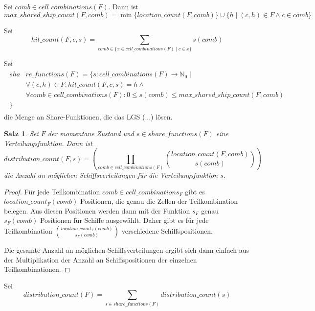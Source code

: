 \documentclass[a4paper,12pt]{llncs}
\newcommand{\N}{{\mathbb{N}}}
\numberwithin{equation}{section}
\newtheorem{satz}{Satz}
\begin{document}
\begin{definition}
Sei $comb \in cell\_combinations(F)$. Dann ist
\[
max\_shared\_ship\_count(F,comb)=\min\{location\_count(F, comb)\} \cup \{h \mid (c,h) \in F \wedge c \in comb\}
\]
\end{definition}

\begin{definition}
Sei
\[
hit\_count(F, c, s)=\sum_{comb \in \{x \in cell\_combinations(F) \mid c \in x\}}{s(comb)}
\]
\end{definition}

\begin{definition}
Sei
\begin{align}
\begin{split}
sha&re\_functions(F)=\{s \colon cell\_combinations(F) \rightarrow \N_0 \mid\\
&\forall{(c,h) \in F}\colon hit\_count(F, c, s)=h \wedge \\
&\forall{comb \in cell\_combinations(F)} \colon 0 \leq s(comb) \leq max\_shared\_ship\_count(F, comb)\\
\}\;\;\;& \nonumber
\end{split}
\end{align}
die Menge an Share-Funktionen, die das LGS (...) lösen.
\end{definition}

\begin{satz}
Sei $F$ der momentane Zustand und $s \in share\_functions(F)$ eine Verteilungsfunktion.
Dann ist
\[
distribution\_count(F, s)=
\left( \prod_{comb \in cell\_combinations(F)}{{location\_count(F, comb)\choose s(comb)}} \right)
\]
die Anzahl an möglichen Schiffsverteilungen für die Verteilungsfunktion $s$.
\end{satz}

\begin{proof}
Für jede Teilkombination $comb \in cell\_combinations_F$ gibt es $location\_count_F(comb)$ Positionen, die genau die Zellen der Teilkombination belegen. Aus diesen Positionen werden dann mit der Funktion $s_F$ genau $s_F(comb)$ Positionen für Schiffe ausgewählt. Daher gibt es für jede Teilkombination ${location\_count_F(comb)\choose s_F(comb)}$ verschiedene Schiffspositionen.

Die gesamte Anzahl an möglichen Schiffsverteilungen ergibt sich dann einfach aus der Multiplikation der Anzahl an Schiffspositionen der einzelnen Teilkombinationen.
\end{proof}

\begin{definition}
Sei
\[
distribution\_count(F)=\sum_{s \in share\_functions(F)}{distribution\_count(s)}
\]
\end{definition}
\end{document}
